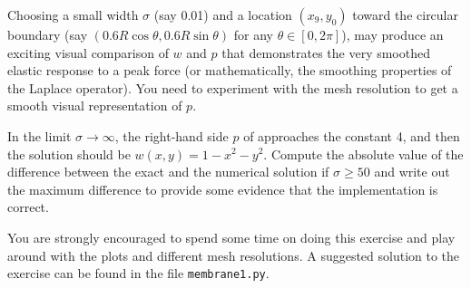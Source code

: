 Choosing a small width $\sigma$ (say 0.01)
and a location $(x_9,y_0)$ toward the circular boundary
(say $(0.6R\cos\theta, 0.6R\sin\theta)$ for any $\theta\in [0,2\pi]$),
may produce an exciting visual comparison of $w$ and $p$ that 
demonstrates the very smoothed elastic response to a peak force
(or mathematically, the smoothing properties of the Laplace operator).
You need to experiment with the mesh resolution to get a smooth
visual representation of $p$.

In the limit $\sigma\rightarrow\infty$, the right-hand side $p$ of
 approaches the constant 4,
and then the solution should be $w(x,y) = 1-x^2-y^2$.
Compute the absolute value of the
difference between the exact and the numerical solution
if $\sigma \geq 50$ and write out the maximum difference
to provide some evidence that the implementation is correct.

You are strongly encouraged to spend some time on doing 
this exercise and play around with
the plots and different mesh resolutions. 
A suggested solution to the exercise
can be found in the file {\fontsize{12pt}{12pt}\texttt{membrane1.py}}.


